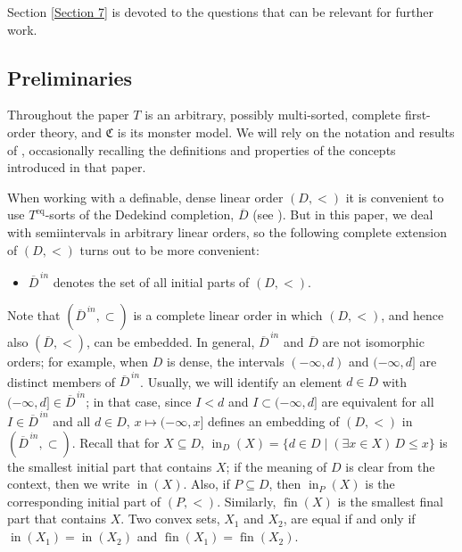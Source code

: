 \documentclass{amsart}
\theoremstyle{definition}
\theoremstyle{definition}
\newcommand{\Mon}{\mathfrak C}
\DeclareMathOperator{\supin}{in}
\DeclareMathOperator{\fin}{fin}
\begin{document}
Section \ref{Section 7} is devoted to the questions that can be relevant for further work.  

 


\subsection{Preliminaries} 

Throughout the paper $T$ is an arbitrary, possibly multi-sorted, complete first-order theory, and $\Mon$ is its monster model. 
We will rely on the notation and results of \cite{MTwqom1}, occasionally recalling the definitions and properties of the concepts introduced in that paper. 


 
When working with a definable, dense linear order $(D,<)$ it is convenient to use $T^\mathrm{eq}$-sorts of the Dedekind completion, $\overline D$ (see \cite{Mac}). But in this paper, we deal with semiintervals in arbitrary linear orders, so the following complete extension of $(D,<)$ turns out to be more convenient:
\begin{itemize}
    \item $\overline D^{\,in}$ denotes the set of all initial parts of $(D,<)$.
\end{itemize}
Note that $(\overline D^{\,in}, \subset)$ is a complete linear order in which $(D,<)$, and hence also $(\overline D,<)$, can be embedded. In general,  $\overline D^{\,in}$ and  $\overline D$ are not isomorphic orders; for example,  when $D$ is dense, the intervals $(-\infty, d)$ and $(-\infty, d]$ are distinct members of $\overline D^{\,in}$. Usually, we will identify an element $d\in D$ with $(-\infty, d]\in \overline D^{\,in}$; in that case, since $I<d$ and $I\subset (-\infty, d]$ are equivalent for all $I\in \overline D^{\,in}$ and all $d\in D$, $x\longmapsto (-\infty, x]$ defines an embedding of $(D,<)$ in $(\overline D^{\,in},\subset)$. Recall that for $X\subseteq D$, $\supin_D(X)=\{d\in D\mid (\exists x\in X)\,D\leqslant x\}$ is the smallest initial part that contains $X$; if the meaning of $D$ is clear from the context, then we write $\supin (X)$. Also, if $P\subseteq D$, then $\supin_P(X)$ is the corresponding initial part of $(P,<)$. Similarly, $\fin(X)$ is the smallest final part that contains $X$. Two convex sets, $X_1$ and $X_2$, are equal if and only if $\supin(X_1)=\supin(X_2)$ and $\fin(X_1)=\fin(X_2)$.  
\end{document}
